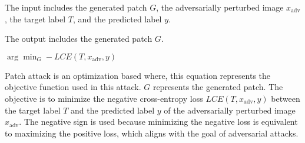 The input includes the generated patch $G$, the adversarially perturbed image $x_{\text{adv}}$, the target label $T$, and the predicted label $y$.

The output includes the generated patch $G$.

$\arg\min_{G} -LCE(T, x_{\text{adv}}, y)$


Patch attack is an optimization based where, this equation represents the objective function used in this attack. $G$ represents the generated patch. The objective is to minimize the negative cross-entropy loss $LCE(T, x_{\text{adv}}, y)$ between the target label $T$ and the predicted label $y$ of the adversarially perturbed image $x_{\text{adv}}$. The negative sign is used because minimizing the negative loss is equivalent to maximizing the positive loss, which aligns with the goal of adversarial attacks.

